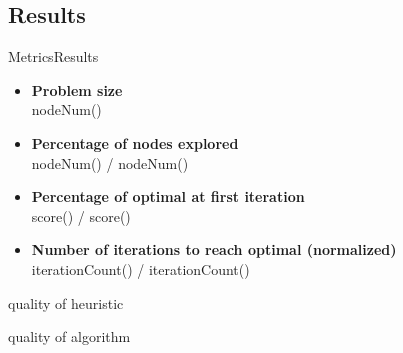 \subsection{Results}

\begin{frame}{Metrics}{Results}

\begin{itemize}
\item \textcolor{metric-PR}{\textbf{Problem size}} \\
nodeNum() 

\item \textcolor{metric-NE}{\textbf{Percentage of nodes explored}}
\\
nodeNum() / nodeNum()

\item \textcolor{metric-OFI}{\textbf{Percentage of optimal at first iteration}}
\\
score() / score()

\item \textcolor{metric-IRO}{\textbf{Number of iterations to reach optimal (normalized)}}
\\
iterationCount() / iterationCount()
\end{itemize}

\end{frame}

\begin{frame}

quality of heuristic


quality of algorithm

\end{frame}

